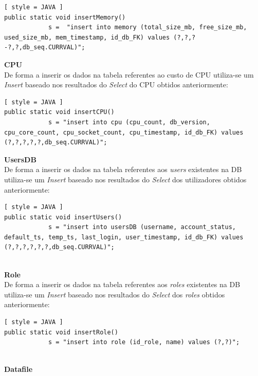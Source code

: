 \documentclass[a4paper]{article}
\begin{document}
\begin{lstlisting}[ style = JAVA ]
public static void insertMemory() 
            s =  "insert into memory (total_size_mb, free_size_mb, used_size_mb, mem_timestamp, id_db_FK) values (?,?,?-?,?,db_seq.CURRVAL)";
\end{lstlisting}

\textbf{\large CPU}\\

De forma a inserir os dados na tabela referentes ao custo de CPU utiliza-se um \emph{Insert} baseado nos resultados do \emph{Select} do CPU obtidos anteriormente:

\begin{lstlisting}[ style = JAVA ]
public static void insertCPU() 
            s = "insert into cpu (cpu_count, db_version, cpu_core_count, cpu_socket_count, cpu_timestamp, id_db_FK) values (?,?,?,?,?,db_seq.CURRVAL)";

\end{lstlisting}

\textbf{\large UsersDB}\\

De forma a inserir os dados na tabela referentes aos \emph{users} existentes na DB utiliza-se um \emph{Insert} baseado nos resultados do \emph{Select} dos utilizadores obtidos anteriormente:

\begin{lstlisting}[ style = JAVA ]
public static void insertUsers() 
            s = "insert into usersDB (username, account_status, default_ts, temp_ts, last_login, user_timestamp, id_db_FK) values (?,?,?,?,?,?,db_seq.CURRVAL)";


\end{lstlisting}

\newpage

\textbf{\large Role}\\

De forma a inserir os dados na tabela referentes aos \emph{roles} existentes na DB utiliza-se um \emph{Insert} baseado nos resultados do \emph{Select} dos \emph{roles} obtidos anteriormente:

\begin{lstlisting}[ style = JAVA ]
public static void insertRole() 
            s = "insert into role (id_role, name) values (?,?)";


\end{lstlisting}

\textbf{\large Datafile}\\
\end{document}
